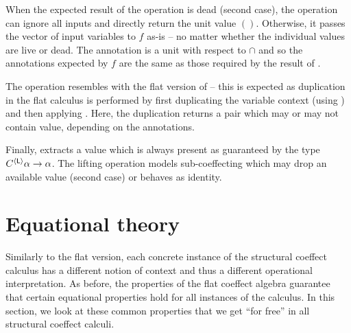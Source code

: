 \noindent
When the expected result of the  operation is dead (second case), the operation can
ignore all inputs and directly return the unit value $()$. Otherwise, it passes the vector of 
input variables to $f$ as-is -- no matter whether the individual values are live or dead. The
 annotation is a unit with respect to $\cap$ and so the annotations expected by $f$ are
the same as those required by the result of .

The  operation resembles with the flat version of  -- this is expected as
duplication in the flat calculus is performed by first duplicating the variable context (using 
) and then applying . Here, the duplication returns a pair which may or
may not contain value, depending on the annotations.

Finally,  extracts a value which is always present as guaranteed by the type
$C^{\langle \textnormal{\sffamily L} \rangle}\alpha \rightarrow \alpha$. The lifting operation models 
sub-coeffecting which may drop an available value (second case) or behaves as identity.


%                                                                   
%

\section{Equational theory}
\label{sec:struct-syntax}

Similarly to the flat version, each concrete instance of the structural coeffect calculus has a 
different notion of context and thus a different operational interpretation. As before, the 
properties of the flat coeffect algebra guarantee that certain equational properties hold for 
all instances of the calculus. In this section, we look at these common properties that we get
``for free'' in all structural coeffect calculi.

